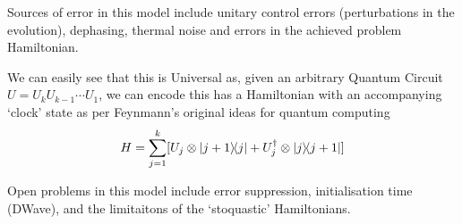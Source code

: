 \documentclass[11pt]{article}
\begin{document}
Sources of error in this model include unitary control errors (perturbations in the evolution), dephasing, thermal noise and errors in the achieved problem Hamiltonian.

We can easily see that this is Universal as, given an arbitrary Quantum Circuit $U=U_{k}U_{k-1}\cdots U_{1}$, we can encode this has a Hamiltonian with an accompanying `clock' state as per Feynmann's original ideas for quantum computing
\begin{equation}
    H=\sum_{j=1}^{k}[U_{j}\otimes\ketbra{j+1}{j}+U_{j}^{\dagger}\otimes\ketbra{j}{j+1}]
\end{equation}

Open problems in this model include error suppression, initialisation time (DWave), and the limitaitons of the `stoquastic' Hamiltonians.
\end{document}
